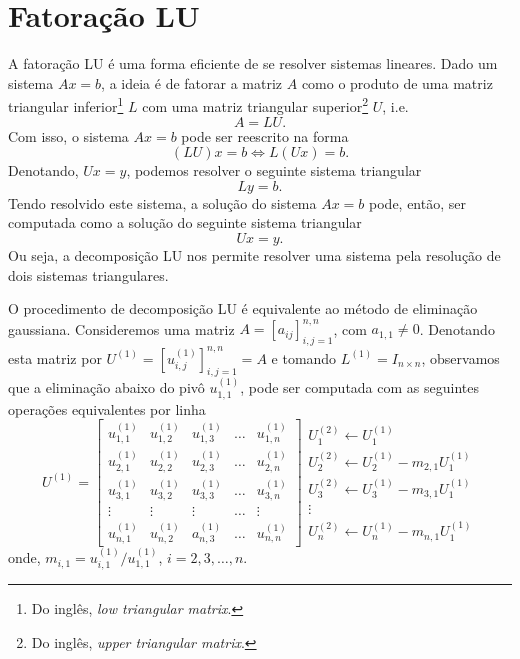 \section{Fatoração LU}\label{cap_sl_direto_sec_lu}

A fatoração LU é uma forma eficiente de se resolver sistemas lineares. Dado um sistema $Ax = b$, a ideia é de fatorar a matriz $A$ como o produto de uma matriz triangular inferior\footnote{Do inglês, {\it low triangular matrix}.} $L$ com uma matriz triangular superior\footnote{Do inglês, {\it upper triangular matrix}.} $U$, i.e.
\begin{equation}
  A = LU.
\end{equation}
Com isso, o sistema $Ax = b$ pode ser reescrito na forma
\begin{equation}
  (LU)x = b \Leftrightarrow L(Ux) = b.
\end{equation}
Denotando, $Ux = y$, podemos resolver o seguinte sistema triangular
\begin{equation}
  Ly = b.
\end{equation}
Tendo resolvido este sistema, a solução do sistema $Ax = b$ pode, então, ser computada como a solução do seguinte sistema triangular
\begin{equation}
  Ux = y.
\end{equation}
Ou seja, a decomposição LU nos permite resolver uma sistema pela resolução de dois sistemas triangulares.

O procedimento de decomposição LU é equivalente ao método de eliminação gaussiana. Consideremos uma matriz $A = [a_{ij}]_{i,j=1}^{n,n}$, com $a_{1,1}\neq 0$. Denotando esta matriz por $U^{(1)} = [u_{i,j}^{(1)}]_{i,j=1}^{n,n} = A$ e tomando $L^{(1)} = I_{n\times n}$, observamos que a eliminação abaixo do pivô $u_{1,1}^{(1)}$, pode ser computada com as seguintes operações equivalentes por linha
\begin{equation}
  U^{(1)} = \begin{bmatrix}
    u_{1,1}^{(1)} & u_{1,2}^{(1)} & u_{1,3}^{(1)} & \ldots & u_{1,n}^{(1)} \\
    u_{2,1}^{(1)} & u_{2,2}^{(1)} & u_{2,3}^{(1)} & \ldots & u_{2,n}^{(1)} \\
    u_{3,1}^{(1)} & u_{3,2}^{(1)} & u_{3,3}^{(1)} & \ldots & u_{3,n}^{(1)} \\
    \vdots & \vdots & \vdots & \ldots & \vdots \\
    u_{n,1}^{(1)} & u_{n,2}^{(1)} & a_{n,3}^{(1)} & \ldots & u_{n,n}^{(1)}
  \end{bmatrix}
  \begin{array}{l}
    U_1^{(2)} \leftarrow U_1^{(1)}\\
    U_2^{(2)} \leftarrow U_2^{(1)} - m_{2,1}U_1^{(1)}\\
    U_3^{(2)} \leftarrow U_3^{(1)} - m_{3,1}U_1^{(1)}\\
    \vdots\\
    U_n^{(2)} \leftarrow U_n^{(1)} - m_{n,1}U_1^{(1)}
  \end{array}
\end{equation}
onde, $m_{i,1}=u_{i,1}^{(1)}/u_{1,1}^{(1)}$, $i=2, 3, \dotsc, n$.

